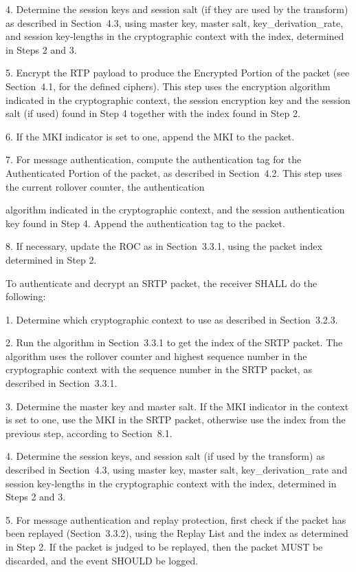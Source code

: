 \documentclass{article}
\begin{document}
4. Determine the session keys and session salt (if they are used by the transform) as described in Section~4.3, using master key, master salt, key\_derivation\_rate, and session key-lengths in the cryptographic context with the index, determined in Steps 2 and 3.

5. Encrypt the RTP payload to produce the Encrypted Portion of the packet (see Section~4.1, for the defined ciphers).  This step uses the encryption algorithm indicated in the cryptographic context, the session encryption key and the session salt (if used) found in Step 4 together with the index found in Step 2.

6. If the MKI indicator is set to one, append the MKI to the packet.

7. For message authentication, compute the authentication tag for the Authenticated Portion of the packet, as described in Section~4.2. This step uses the current rollover counter, the authentication

algorithm indicated in the cryptographic context, and the session authentication key found in Step 4.  Append the authentication tag to the packet.

8. If necessary, update the ROC as in Section~3.3.1, using the packet index determined in Step 2.

To authenticate and decrypt an SRTP packet, the receiver SHALL do the following:

1. Determine which cryptographic context to use as described in Section~3.2.3.

2. Run the algorithm in Section~3.3.1 to get the index of the SRTP packet.  The algorithm uses the rollover counter and highest sequence number in the cryptographic context with the sequence number in the SRTP packet, as described in Section~3.3.1.

3. Determine the master key and master salt.  If the MKI indicator in the context is set to one, use the MKI in the SRTP packet, otherwise use the index from the previous step, according to Section~8.1.

4. Determine the session keys, and session salt (if used by the transform) as described in Section~4.3, using master key, master salt, key\_derivation\_rate and session key-lengths in the cryptographic context with the index, determined in Steps 2 and 3.

5. For message authentication and replay protection, first check if the packet has been replayed (Section~3.3.2), using the Replay List and the index as determined in Step 2.  If the packet is judged to be replayed, then the packet MUST be discarded, and the event SHOULD be logged.
\end{document}
